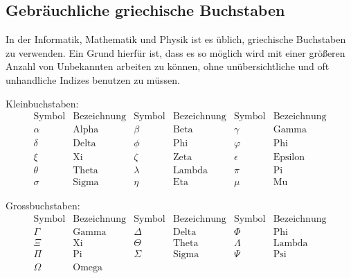 \subsection{Gebräuchliche griechische Buchstaben}
In der Informatik, Mathematik und Physik ist es üblich, griechische 
Buchstaben zu verwenden. Ein Grund hierfür ist, dass es so möglich 
wird mit einer größeren Anzahl von Unbekannten arbeiten zu können, ohne
unübersichtliche und oft unhandliche Indizes benutzen zu müssen.

\bigskip

\noindent Kleinbuchstaben:
\begin{displaymath}
\begin{array}{c|c||c|c||c|c}
\text{Symbol} & \text{Bezeichnung} & \text{Symbol}
& \text{Bezeichnung} & \text{Symbol} & \text{Bezeichnung}\\
\hline
\alpha & \text{Alpha} & \beta   & \text{Beta}   & \gamma   & \text{Gamma}\\
\hline
\delta & \text{Delta} & \phi    & \text{Phi}    & \varphi  & \text{Phi}\\
\hline
\xi    & \text{Xi}    & \zeta   & \text{Zeta}   & \epsilon & \text{Epsilon}\\         
\hline
\theta & \text{Theta} & \lambda & \text{Lambda} & \pi      & \text{Pi}\\
\hline
\sigma & \text{Sigma} & \eta    & \text{Eta}    & \mu      & \text{Mu}
\end{array}
\end{displaymath}

\bigskip

\noindent Grossbuchstaben:
\begin{displaymath}
\begin{array}{c|c||c|c||c|c}
\text{Symbol} & \text{Bezeichnung} & \text{Symbol}
& \text{Bezeichnung} & \text{Symbol} & \text{Bezeichnung}\\
\hline
\Gamma & \text{Gamma} & \Delta & \text{Delta} & \Phi    & \text{Phi}\\
\hline
\Xi    & \text{Xi}    & \Theta & \text{Theta} & \Lambda & \text{Lambda}\\
\hline
\Pi    & \text{Pi}    & \Sigma & \text{Sigma} & \Psi    & \text{Psi}\\
\hline
\Omega & \text{Omega} & &
\end{array}
\end{displaymath}



